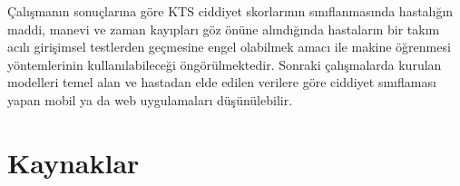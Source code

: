 \documentclass[12pt,twoside]{deuthesis}
\begin{document}
\hfill\break

Çalışmanın sonuçlarına göre KTS ciddiyet skorlarının sınıflanmasında hastalığın maddi, manevi ve zaman kayıpları göz önüne alındığında hastaların bir takım acılı girişimsel testlerden geçmesine engel olabilmek amacı ile makine öğrenmesi yöntemlerinin kullanılabileceği öngörülmektedir. Sonraki çalışmalarda kurulan modelleri temel alan ve hastadan elde edilen verilere göre ciddiyet sınıflaması yapan mobil ya da web uygulamaları düşünülebilir.

\hypertarget{kaynaklar}{%
\chapter*{Kaynaklar}\label{kaynaklar}}

\end{document}
